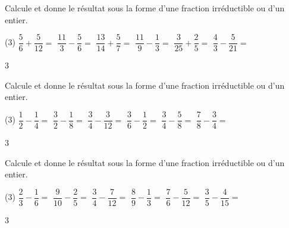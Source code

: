 \documentclass[a4paper,11pt]{report}
\begin{document}
\begin{exo}
{Calcule et donne le résultat sous la forme d'une fraction irréductible ou d'un entier. 

\begin{tasks}(3)
 \task $\dfrac{5}{6}+\dfrac{5}{12}=$
  \task $\dfrac{11}{3}-\dfrac{5}{6}=$
 \task $\dfrac{13}{14}+\dfrac{5}{7}=$
  \task $\dfrac{11}{9}-\dfrac{1}{3}=$  
  \task $\dfrac{3}{25}+\dfrac{2}{5}=$  
  \task $\dfrac{4}{3}-\dfrac{5}{21}=$  
\end{tasks}    
}{3}
\end{exo}

\begin{exo}
{Calcule et donne le résultat sous la forme d'une fraction irréductible ou d'un entier.

\begin{tasks}(3)
\task $\dfrac{1}{2}-\dfrac{1}{4}=$
\task $\dfrac{3}{2}-\dfrac{1}{8}=$
\task $\dfrac{3}{4}-\dfrac{3}{12}=$
\task $\dfrac{3}{6}-\dfrac{1}{2}=$
\task $\dfrac{3}{4}-\dfrac{5}{8}=$
\task $\dfrac{7}{8}-\dfrac{3}{4}=$
\end{tasks}}
{3}
\end{exo}

\begin{exo}
{Calcule et donne le résultat sous la forme d'une fraction irréductible ou d'un entier.

\begin{tasks}(3)
\task $\dfrac{2}{3}-\dfrac{1}{6}=$
\task $\dfrac{9}{10}-\dfrac{2}{5}=$
\task $\dfrac{3}{4}-\dfrac{7}{12}=$
\task $\dfrac{8}{9}-\dfrac{1}{3}=$
\task $\dfrac{7}{6}-\dfrac{5}{12}=$
\task $\dfrac{3}{5}-\dfrac{4}{15}=$
\end{tasks}}
{3}
\end{exo}
\end{document}
